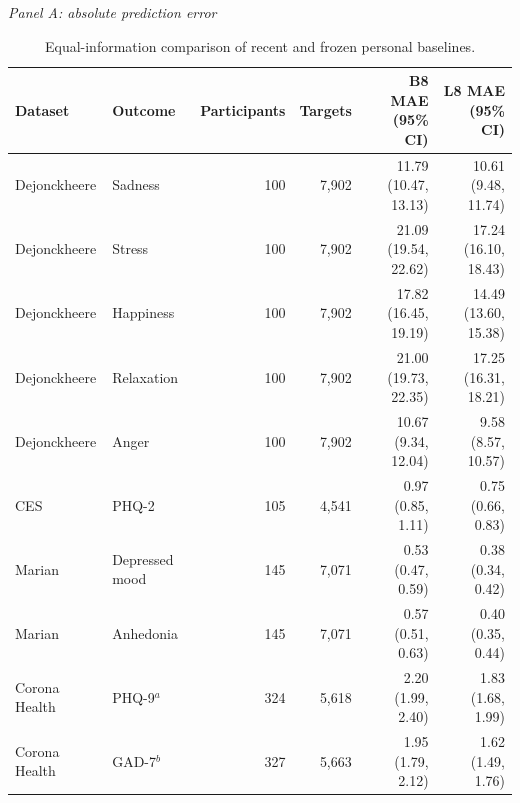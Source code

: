\documentclass[pdflatex,sn-vancouver-num]{sn-jnl}
\begin{document}
\begin{table}[!htbp]
\caption{Equal-information comparison of recent and frozen personal baselines.}\label{tab:main}
\centering
\footnotesize
\textit{Panel A: absolute prediction error}\\[3pt]
\begin{tabular}{@{}llrrrr@{}}
\toprule
Dataset & Outcome & Participants & Targets & B8 MAE (95\% CI) & L8 MAE (95\% CI)\\
\midrule
Dejonckheere & Sadness & 100 & 7,902 & 11.79 (10.47, 13.13) & 10.61 (9.48, 11.74)\\
Dejonckheere & Stress & 100 & 7,902 & 21.09 (19.54, 22.62) & 17.24 (16.10, 18.43)\\
Dejonckheere & Happiness & 100 & 7,902 & 17.82 (16.45, 19.19) & 14.49 (13.60, 15.38)\\
Dejonckheere & Relaxation & 100 & 7,902 & 21.00 (19.73, 22.35) & 17.25 (16.31, 18.21)\\
Dejonckheere & Anger & 100 & 7,902 & 10.67 (9.34, 12.04) & 9.58 (8.57, 10.57)\\
CES & PHQ-2 & 105 & 4,541 & 0.97 (0.85, 1.11) & 0.75 (0.66, 0.83)\\
Marian & Depressed mood & 145 & 7,071 & 0.53 (0.47, 0.59) & 0.38 (0.34, 0.42)\\
Marian & Anhedonia & 145 & 7,071 & 0.57 (0.51, 0.63) & 0.40 (0.35, 0.44)\\
Corona Health & PHQ-9$^{a}$ & 324 & 5,618 & 2.20 (1.99, 2.40) & 1.83 (1.68, 1.99)\\
Corona Health & GAD-7$^{b}$ & 327 & 5,663 & 1.95 (1.79, 2.12) & 1.62 (1.49, 1.76)\\
\bottomrule
\end{tabular}


\end{table}
\end{document}

